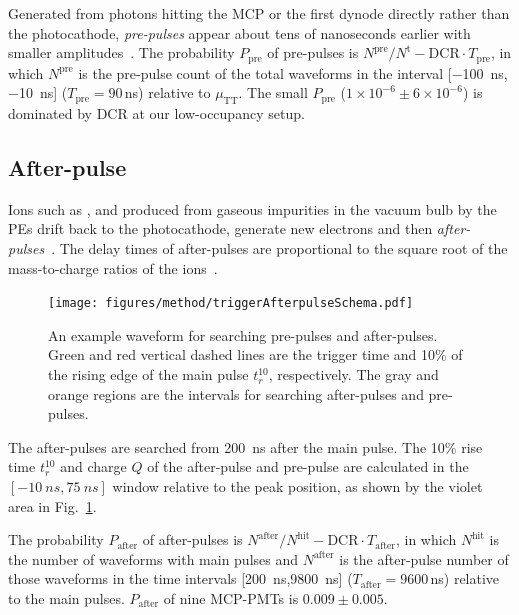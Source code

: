 Generated from photons hitting the MCP or the first dynode directly rather than the photocathode, \emph{pre-pulses} appear about tens of nanoseconds earlier with smaller amplitudes~\cite{JUNOMassTesting}. The probability $P_{\mathrm{pre}}$ of pre-pulses is $N^{\mathrm{pre}}/N^\mathrm{t} - \mathrm{DCR}\cdot T_{\mathrm{pre}}$, in which $N^{\mathrm{pre}}$ is the pre-pulse count of the total waveforms in the interval [\SI{-100}{ns},\SI{-10}{ns}] ($T_{\mathrm{pre}}=90$\,ns) relative to $\mu_{\mathrm{TT}}$. The small $P_{\mathrm{pre}}$ ($1\times10^{-6}\pm6\times10^{-6}$) is dominated by DCR at our low-occupancy setup.

\subsection{After-pulse}
\label{sec:afterpulse}
Ions such as ,  and  produced from gaseous impurities in the vacuum bulb by the PEs drift back to the photocathode, generate new electrons and then \emph{after-pulses}~\cite{JUNOMassTesting,Coates_1973}. The delay times of after-pulses are proportional to the square root of the mass-to-charge ratios of the ions~\cite{XENON1TTesting,Coates_1973,afterpulseTime}. %
\begin{figure}[!htbp]
    \centering
    \texttt{[image: figures/method/triggerAfterpulseSchema.pdf]}
    \caption{An example waveform for searching pre-pulses and after-pulses. Green and red vertical dashed lines are the trigger time and 10\% of the rising edge of the main pulse $t_r^{10}$, respectively. The gray and orange regions are the intervals for searching after-pulses and pre-pulses.}
    \label{fig:afterpulseSchema}
\end{figure}
The after-pulses are searched from \SI{200}{ns} after the main pulse. The 10\% rise time $t_r^{10}$ and charge $Q$ of the after-pulse and pre-pulse are calculated in the $[-\SI{10}{ns},\SI{75}{ns}]$ window relative to the peak position, as shown by the violet area in Fig.~\ref{fig:afterpulseSchema}.

The probability $P_{\mathrm{after}}$ of after-pulses is $N^{\mathrm{after}}/N^\mathrm{hit} - \mathrm{DCR}\cdot T_{\mathrm{after}}$, in which $N^{\mathrm{hit}}$ is the number of waveforms with main pulses and $N^{\mathrm{after}}$ is the after-pulse number of those waveforms in the time intervals [\SI{200}{ns},\SI{9800}{ns}] ($T_{\mathrm{after}}=9600$\,ns) relative to the main pulses. $P_{\mathrm{after}}$ of nine MCP-PMTs is $0.009\pm0.005$.

